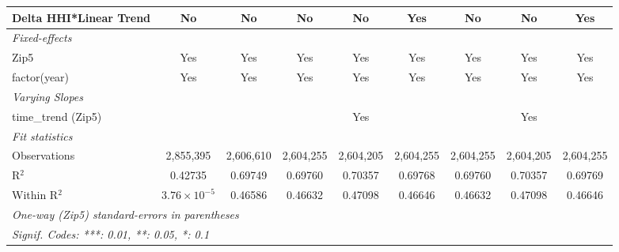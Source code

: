 \begin{table}[H]
{\begin{tabular}{lcccccccc}
 Delta HHI*Linear Trend & No & No & No & No & Yes & No & No & Yes\\ 

 \midrule \emph{Fixed-effects}&   &   &   &   &   &   &   &  \\ 

 Zip5 & Yes & Yes & Yes & Yes & Yes & Yes & Yes & Yes\\ 

 factor(year) & Yes & Yes & Yes & Yes & Yes & Yes & Yes & Yes\\ 

 \midrule \emph{Varying Slopes}&   &   &   &   &   &   &   &  \\ 

 time\_trend (Zip5) &  &  &  & Yes &  &  & Yes & \\ 

 \midrule \emph{Fit statistics}&  & & & & & & & \\ 

 Observations & 2,855,395&2,606,610&2,604,255&2,604,205&2,604,255&2,604,255&2,604,205&2,604,255\\ 

 R$^2$ & 0.42735&0.69749&0.69760&0.70357&0.69768&0.69760&0.70357&0.69769\\ 

 Within R$^2$ & $3.76\times 10^{-5}$&0.46586&0.46632&0.47098&0.46646&0.46632&0.47098&0.46646\\ 

 \midrule\midrule\multicolumn{9}{l}{\emph{One-way (Zip5) standard-errors in parentheses}}\\ 

 \multicolumn{9}{l}{\emph{Signif. Codes: ***: 0.01, **: 0.05, *: 0.1}}\\ 

 \end{tabular}} 

 \end{table} 

  


